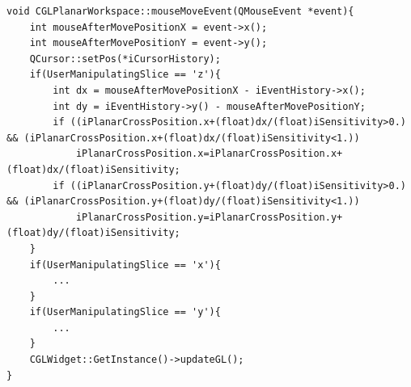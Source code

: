 \begin{lstlisting}[label=DicomImageClass,caption={První část souboru \texttt{Window.cpp} se zdrojovým kódem třídy reprezentující okno programu.}]
void CGLPlanarWorkspace::mouseMoveEvent(QMouseEvent *event){
	int mouseAfterMovePositionX = event->x();
	int mouseAfterMovePositionY = event->y();
	QCursor::setPos(*iCursorHistory);
	if(UserManipulatingSlice == 'z'){
		int dx = mouseAfterMovePositionX - iEventHistory->x();
		int dy = iEventHistory->y() - mouseAfterMovePositionY;
		if ((iPlanarCrossPosition.x+(float)dx/(float)iSensitivity>0.) && (iPlanarCrossPosition.x+(float)dx/(float)iSensitivity<1.))
			iPlanarCrossPosition.x=iPlanarCrossPosition.x+(float)dx/(float)iSensitivity;
		if ((iPlanarCrossPosition.y+(float)dy/(float)iSensitivity>0.) && (iPlanarCrossPosition.y+(float)dy/(float)iSensitivity<1.))
			iPlanarCrossPosition.y=iPlanarCrossPosition.y+(float)dy/(float)iSensitivity;
	}
	if(UserManipulatingSlice == 'x'){
 		...
	}
	if(UserManipulatingSlice == 'y'){
 		...
	}
	CGLWidget::GetInstance()->updateGL();
}
\end{lstlisting}


